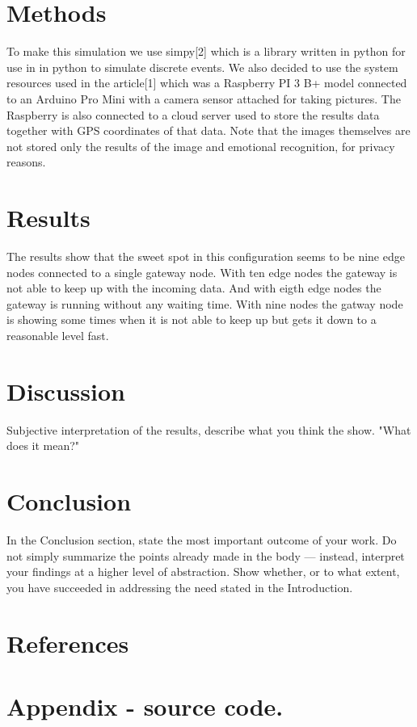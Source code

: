 \documentclass[a4paper,11pt,notitlepage]{article}
\begin{document}
  \section{Methods}
    To make this simulation we use simpy[2] which is a library written in python for use in
    in python to simulate discrete events. We also decided to use the system resources used
    in the article[1] which was a Raspberry PI 3 B+ model connected to an Arduino Pro Mini
    with a camera sensor attached for taking pictures. The Raspberry is also connected to a
    cloud server used to store the results data together with GPS coordinates of that data.
    Note that the images themselves are not stored only the results of the image and
    emotional recognition, for privacy reasons.
  
  \section{Results}
    The results show that the sweet spot in this configuration seems to be nine edge nodes
    connected to a single gateway node. With ten edge nodes the gateway is not able to keep
    up with the incoming data. And with eigth edge nodes the gateway is running without any
    waiting time. With nine nodes the gatway node is showing some times when it is not able
    to keep up but gets it down to a reasonable level fast.
    
  \section{Discussion}
    Subjective interpretation of the results, describe what you think the show.
    "What does it mean?"
    
  \section{Conclusion}
    In the Conclusion section, state the most important outcome of your work. Do not simply
    summarize the points already made in the body — instead, interpret your findings at a
    higher level of abstraction. Show whether, or to what extent, you have succeeded in
    addressing the need stated in the Introduction.
    
  \section{References}
    

  \onecolumn
  \section{Appendix - source code.}
\end{document}
